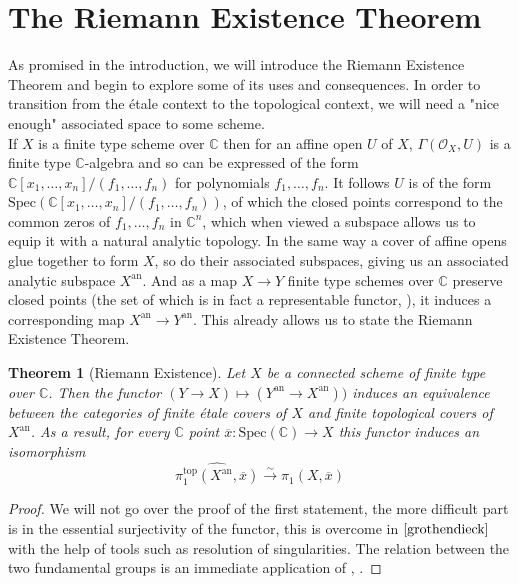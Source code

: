\documentclass{article}
\newtheorem{theorem}{Theorem}[section]
\theoremstyle{definition}
\theoremstyle{remark}
\newcommand{\C}{\mathbb{C}}
\newcommand{\mc}[1]{\mathcal{#1}}
\begin{document}
\section{The Riemann Existence Theorem}

As promised in the introduction, we will introduce the Riemann Existence Theorem and begin to explore some of its uses and consequences.
In order to transition from the \'etale context to the topological context, we will need a "nice enough" associated space to some scheme.\\

\indent If $X$ is a finite type scheme over $\C$ then for an affine open $U$ of $X$, $\Gamma(\mc{O}_X, U)$ is a finite type $\C$-algebra and so can be expressed of the form $\C[x_1, \dots, x_n]/(f_1, \dots, f_n)$ for polynomials $f_1, \dots, f_n$.
It follows $U$ is of the form $\text{Spec}(\C[x_1, \dots, x_n]/(f_1, \dots, f_n))$, of which the closed points correspond to the common zeros of $f_1, \dots, f_n$ in $\C^n$, which when viewed a subspace allows us to equip it with a natural analytic topology.
In the same way a cover of affine opens glue together to form $X$, so do their associated subspaces, giving us an associated analytic subspace $X^{\text{an}}$.
And as a map $X \to Y$ finite type schemes over $\C$ preserve closed points (the set of which is in fact a representable functor, ), it induces a corresponding map $X^{\text{an}} \to Y^{\text{an}}$.
This already allows us to state the Riemann Existence Theorem.


\begin{theorem}[Riemann Existence]
	Let $X$ be a connected scheme of finite type over $\C$.
	Then the functor $(Y \to X) \mapsto (Y^{\text{an}} \to X^{\text{an}}))$ induces an equivalence between the categories of finite \'etale covers of $X$ and finite topological covers of $X^{\text{an}}$.
	As a result, for every $\C$ point $\overline{x}: \text{Spec}(\C) \to X$ this functor induces an isomorphism
	\[\widehat{\pi_1^{\text{top}}(X^{\text{an}}, \overline{x})} \xrightarrow{\sim} \pi_1(X, \overline{x})\]
\end{theorem}

\begin{proof}
	We will not go over the proof of the first statement, the more difficult part is in the essential surjectivity of the functor, this is overcome in $\cite{grothendieck}$ with the help of tools such as resolution of singularities.
	The relation between the two fundamental groups is an immediate application of , .
\end{proof}
\end{document}
